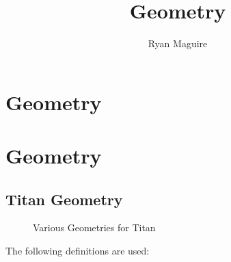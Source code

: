 \documentclass[crop=false,class=book,oneside]{standalone}
\begin{document}
    \ifx\ifplanetdiff\undefined
        \newif\iffunct
        \title{Geometry}
        \author{Ryan Maguire}
        \date{\vspace{-5ex}}
        \maketitle
        \tableofcontents
        \clearpage
        \chapter{Geometry}
        \setcounter{chapter}{2}
    \else
        \chapter{Geometry}
    \fi
    \section{Titan Geometry}
        \begin{figure}[H]
        	\centering
        	\captionsetup{type=figure}
        	\begin{subfigure}[b]{0.49\textwidth}
        	    \centering
        	    \captionsetup{type=figure}
        	    \label{fig:math_titan_geom_vec}
            \end{subfigure}
            \begin{subfigure}[b]{0.49\textwidth}
                \centering
                \captionsetup{type=figure}
                \label{fig:math_geo_bending_angle}
            \end{subfigure}
            \caption{Various Geometries for Titan}
        \end{figure}
        The following definitions are used:
\end{document}
